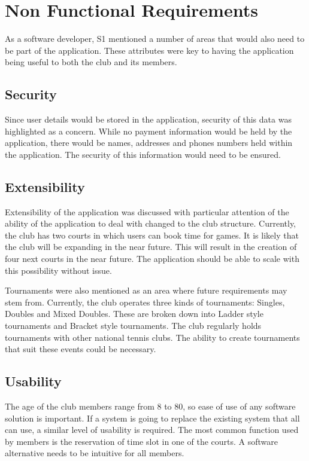 \section{Non Functional Requirements}

As a software developer, S1 mentioned a number of areas that would also need to be part of the application. These attributes were key to having the application being useful to both the club and its members.

\subsection{Security}

Since user details would be stored in the application, security of this data was highlighted as a concern. While no payment information would be held by the application, there would be names, addresses and phones numbers held within the application. The security of this information would need to be ensured.

\subsection{Extensibility}

Extensibility of the application was discussed with particular attention of the ability of the application to deal with changed to the club structure. Currently, the club has two courts in which users can book time for games. It is likely that the club will be expanding in the near future. This will result in the creation of four next courts in the near future. The application should be able to scale with this possibility without issue.

Tournaments were also mentioned as an area where future requirements may stem from. Currently, the club operates three kinds of tournaments: Singles, Doubles and Mixed Doubles. These are broken down into Ladder style tournaments and Bracket style tournaments. The club regularly holds tournaments with other national tennis clubs. The ability to create tournaments that suit these events could be necessary.

\subsection{Usability}

The age of the club members range from 8 to 80, so ease of use of any software solution is important. If a system is going to replace the existing system that all can use, a similar level of usability is required. The most common function used by members is the reservation of time slot in one of the courts. A software alternative needs to be intuitive for all members.


